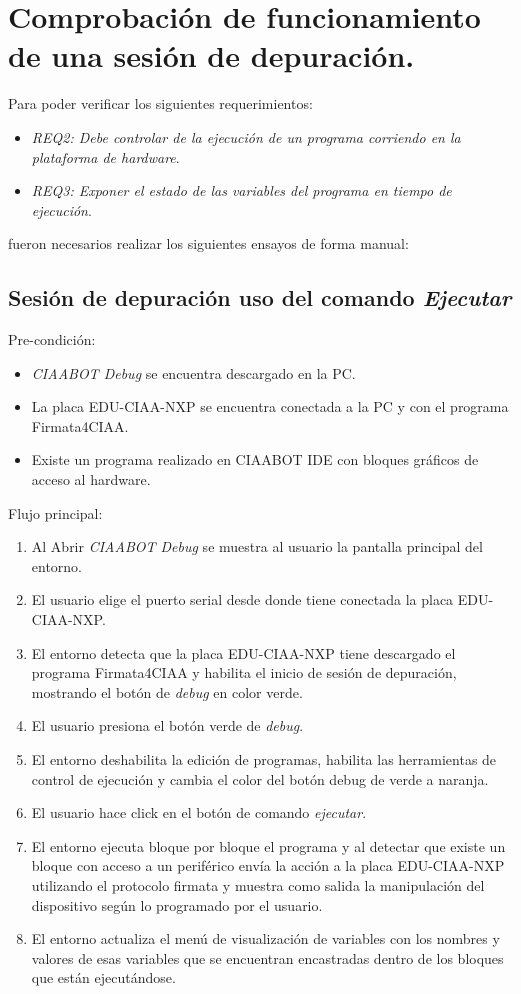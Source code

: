 \section{Comprobación de funcionamiento de una sesión de depuración.}
\label{sec:Comprobación de funcionamiento de una sesión de depuración.}

Para poder verificar los siguientes requerimientos:

 \begin{itemize}
 	\item \emph{REQ2: Debe controlar de la ejecución de un programa corriendo en la plataforma de hardware}.
 	\item \emph{REQ3: Exponer el estado de las variables del programa en tiempo de ejecución}.
 \end{itemize}

 fueron necesarios realizar los siguientes ensayos de forma manual:

\subsection{Sesión de depuración uso del comando \emph{Ejecutar}}
Pre-condición:
\begin{itemize}
	\item \emph{CIAABOT Debug} se encuentra descargado en la PC.
	\item La placa EDU-CIAA-NXP se encuentra conectada a la PC y con el programa Firmata4CIAA.
	\item Existe un programa realizado en CIAABOT IDE con bloques gráficos de acceso al hardware.
\end{itemize}

Flujo principal:
\begin{enumerate}
	\item
	Al Abrir \emph{CIAABOT Debug} se muestra al usuario la pantalla principal del entorno. 
	\item
	El usuario elige el puerto serial desde donde tiene conectada la placa EDU-CIAA-NXP.
	\item
	El entorno detecta que la placa EDU-CIAA-NXP tiene descargado el programa Firmata4CIAA y habilita el inicio de sesión de depuración, mostrando el botón de \emph{debug} en color verde.
	\item
	El usuario presiona el botón verde de \emph{debug}.
	\item
	El entorno deshabilita la edición de programas, habilita las herramientas de control de ejecución y cambia el color del botón debug de verde a naranja.
	\item
	El usuario hace click en el botón de comando \emph{ejecutar}.
	\item
	El entorno ejecuta bloque por bloque el programa y al detectar que existe un bloque con acceso a un periférico envía la acción a la placa EDU-CIAA-NXP utilizando el protocolo firmata y muestra como salida la manipulación del dispositivo según lo programado por el usuario.
	\item
	El entorno actualiza el menú de visualización de variables con los nombres y valores de esas variables que se encuentran encastradas dentro de los bloques que están ejecutándose. 
\end{enumerate}

